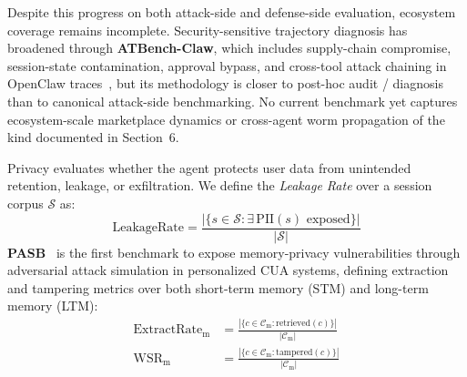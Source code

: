Despite this progress on both attack-side and defense-side evaluation, ecosystem coverage remains incomplete. Security-sensitive trajectory diagnosis has broadened through \textbf{ATBench-Claw}, which includes supply-chain compromise, session-state contamination, approval bypass, and cross-tool attack chaining in OpenClaw traces~\cite{atbenchclaw2026}, but its methodology is closer to post-hoc audit / diagnosis than to canonical attack-side benchmarking. No current benchmark yet captures ecosystem-scale marketplace dynamics or cross-agent worm propagation of the kind documented in Section~6.


Privacy evaluates whether the agent protects user data from unintended retention, leakage, or exfiltration. We define the \emph{Leakage Rate} over a session corpus $\mathcal{S}$ as:
\begin{equation}
\mathrm{LeakageRate} = \frac{|\{s \in \mathcal{S} : \exists\, \mathrm{PII}(s) \text{ exposed}\}|}{|\mathcal{S}|}
\label{eq:leakage}
\end{equation}
\textbf{PASB}~\cite{doubleagent2026} is the first benchmark to expose memory-privacy vulnerabilities through adversarial attack simulation in personalized CUA systems, defining extraction and tampering metrics over both short-term memory (STM) and long-term memory (LTM):
\begin{align}
\mathrm{ExtractRate}_{\mathrm{m}} &= \frac{|\{c \in \mathcal{C}_{\mathrm{m}} : \mathrm{retrieved}(c)\}|}{|\mathcal{C}_{\mathrm{m}}|} \label{eq:extractrate} \\
\mathrm{WSR}_{\mathrm{m}} &= \frac{|\{c \in \mathcal{C}_{\mathrm{m}} : \mathrm{tampered}(c)\}|}{|\mathcal{C}_{\mathrm{m}}|} \label{eq:pasb-mem}
\end{align}
